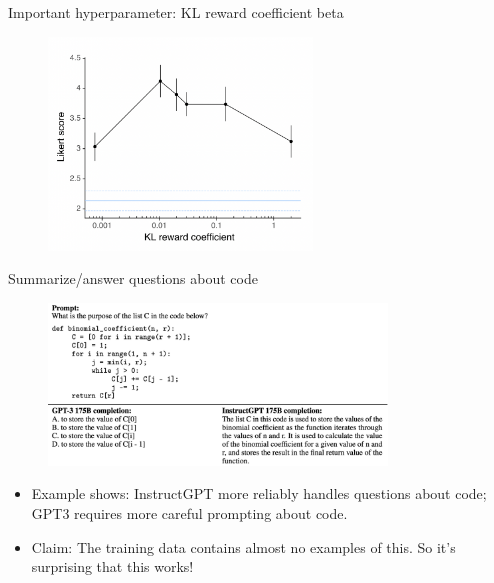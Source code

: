 \begin{vbframe}{Important hyperparameter: KL reward
	coefficient beta}

\vfill

\begin{figure}
\centering
\includegraphics[width = 7cm]{figure/klrewardcoefficient.png}
\end{figure}

\vfill

\end{vbframe}


\begin{vbframe}{Summarize/answer questions about code}

\vfill

\begin{figure}
\centering
\includegraphics[width = 9cm]{figure/questionsaboutcode.png}
\end{figure}

\begin{itemize}
	\item Example shows: InstructGPT more reliably handles questions
	about code;
        GPT3 requires more careful prompting
	about code.
        \item Claim: The training data contains almost no examples
	of this.
 So it's surprising that this works!
\end{itemize}

\vfill

\end{vbframe}



